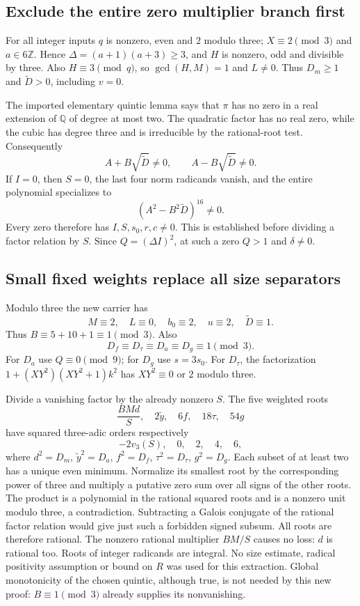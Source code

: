 \documentclass[11pt]{article}
\begin{document}
\subsection{Exclude the entire zero multiplier branch first}
For all integer inputs $q$ is nonzero, even and $2$ modulo three;
$X\equiv2\pmod3$ and $a\in6\mathbb Z$. Hence
$\Delta=(a+1)(a+3)\ge3$, and $H$ is nonzero, odd and divisible by three.
Also $H\equiv3\pmod q$, so $\gcd(H,M)=1$ and $L\ne0$.
Thus $D_m\ge1$ and $\widetilde D>0$, including $v=0$.

The imported elementary quintic lemma says that $\pi$ has no zero in
a real extension of $\mathbb Q$ of degree at most two. The quadratic
factor has no real zero, while the cubic has degree three and is
irreducible by the rational-root test. Consequently
\[
 A+B\sqrt{\widetilde D}\ne0,
 \qquad A-B\sqrt{\widetilde D}\ne0.
\]
If $I=0$, then $S=0$, the last four norm radicands vanish, and the entire
polynomial specializes to
\[
 (A^2-B^2\widetilde D)^{16}\ne0.
\]
Every zero therefore has $I,S,s_0,r,c\ne0$. This is established before
dividing a factor relation by $S$. Since $Q=(\Delta I)^2$, at such a
zero $Q>1$ and $\delta\ne0$.

\subsection{Small fixed weights replace all size separators}
Modulo three the new carrier has
\[
 M\equiv2,\quad L\equiv0,\quad b_0\equiv2,
 \quad u\equiv2,\quad\widetilde D\equiv1.
\]
Thus $B\equiv5+10+1\equiv1\pmod3$. Also
\[
 D_f\equiv D_\tau\equiv D_a\equiv D_g\equiv1\pmod3.
\]
For $D_a$ use $Q\equiv0\pmod9$; for $D_g$ use $s=3s_0$.
For $D_\tau$, the factorization
$1+(XY^2)(XY^2+1)k^2$ has $XY^2\equiv0$ or $2$ modulo three.

Divide a vanishing factor by the already nonzero $S$.
The five weighted roots
\[
 \frac{BMd}{S},\quad 2\widetilde y,\quad6f,
 \quad18\tau,\quad54g
\]
have squared three-adic orders respectively
\[
 -2v_3(S),\quad0,\quad2,\quad4,\quad6,
\]
where $d^2=D_m$, $\widetilde y^2=D_a$, $f^2=D_f$,
$\tau^2=D_\tau$, $g^2=D_g$.
Each subset of at least two has a unique even minimum. Normalize its
smallest root by the corresponding power of three and multiply a putative
zero sum over all signs of the other roots. The product is a polynomial
in the rational squared roots and is a nonzero unit modulo three, a
contradiction. Subtracting a Galois conjugate of the rational factor
relation would give just such a forbidden signed subsum. All roots are
therefore rational. The nonzero rational multiplier $BM/S$ causes no
loss: $d$ is rational too. Roots of integer radicands are integral.
No size estimate, radical positivity assumption or bound on $R$ was
used for this extraction. Global monotonicity of the chosen quintic,
although true, is not needed by this new proof: $B\equiv1\pmod3$
already supplies its nonvanishing.
\end{document}
